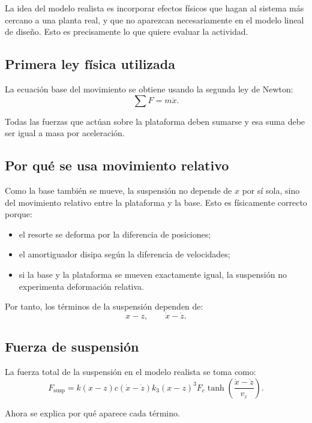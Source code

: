 \documentclass[11pt]{article}
\begin{document}
La idea del modelo realista es incorporar efectos f\'isicos que hagan al sistema m\'as cercano a una planta real, y que no aparezcan necesariamente en el modelo lineal de dise\~no. Esto es precisamente lo que quiere evaluar la actividad.

\subsection{Primera ley f\'isica utilizada}

La ecuaci\'on base del movimiento se obtiene usando la segunda ley de Newton:
\[
\sum F = m\ddot{x}.
\]

Todas las fuerzas que act\'uan sobre la plataforma deben sumarse y esa suma debe ser igual a masa por aceleraci\'on.

\subsection{Por qu\'e se usa movimiento relativo}

Como la base tambi\'en se mueve, la suspensi\'on no depende de $x$ por s\'i sola, sino del movimiento relativo entre la plataforma y la base. Esto es f\'isicamente correcto porque:

\begin{itemize}[leftmargin=1.2cm]
\item el resorte se deforma por la diferencia de posiciones;
\item el amortiguador disipa seg\'un la diferencia de velocidades;
\item si la base y la plataforma se mueven exactamente igual, la suspensi\'on no experimenta deformaci\'on relativa.
\end{itemize}

Por tanto, los t\'erminos de la suspensi\'on dependen de:
\[
x-z, \qquad \dot{x}-\dot{z}.
\]

\subsection{Fuerza de suspensi\'on}

La fuerza total de la suspensi\'on en el modelo realista se toma como:
\begin{equation}
F_{\text{susp}} =
k(x-z)
c(\dot{x}-\dot{z})
k_3(x-z)^3
F_c\tanh\left(\frac{\dot{x}-\dot{z}}{v_\varepsilon}\right).
\label{eq:fsusp}
\end{equation}

Ahora se explica por qu\'e aparece cada t\'ermino.
\end{document}
